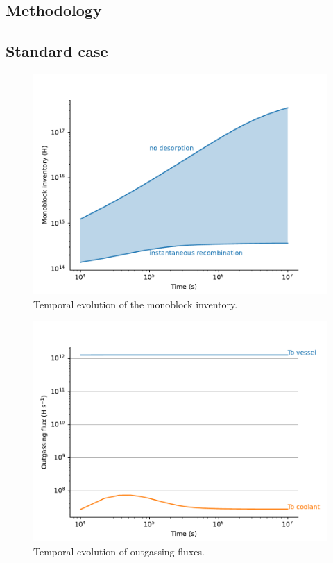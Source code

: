 \subsection{Methodology}
\subsection{Standard case}

\begin{figure}
    \centering
    \includegraphics[width=\linewidth]{Figures/Chapter3/monoblocks/3D_monoblocks/inventory.pdf}
    \caption{Temporal evolution of the monoblock inventory.}
\end{figure}


\begin{figure}
    \centering
    \includegraphics[width=\linewidth]{Figures/Chapter3/monoblocks/3D_monoblocks/fluxes.pdf}
    \caption{Temporal evolution of outgassing fluxes.}
\end{figure}

